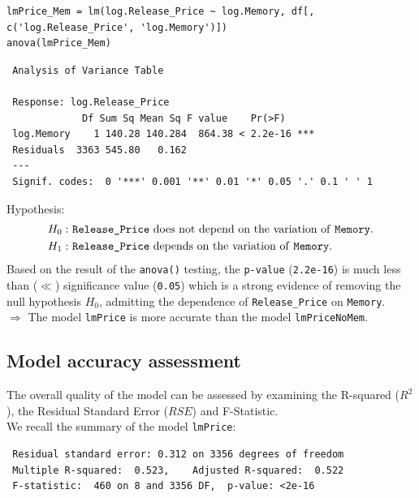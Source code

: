 \documentclass[a4paper]{article}
\begin{document}
\begin{mdframed}[leftline=false,rightline=false,backgroundcolor=lightblue!10,nobreak=false]
    \begin{verbatim}
lmPrice_Mem = lm(log.Release_Price ~ log.Memory, df[, c('log.Release_Price', 'log.Memory')])
anova(lmPrice_Mem)
    \end{verbatim}
\end{mdframed}
\begin{lstlisting}
 Analysis of Variance Table

 Response: log.Release_Price
             Df Sum Sq Mean Sq F value    Pr(>F)    
 log.Memory    1 140.28 140.284  864.38 < 2.2e-16 ***
 Residuals  3363 545.80   0.162                    
 ---
 Signif. codes:  0 '***' 0.001 '**' 0.01 '*' 0.05 '.' 0.1 ' ' 1
\end{lstlisting}
Hypothesis:
\begin{align*}
    H_0: &\text{ \texttt{Release\_Price} does not depend on the variation of \texttt{Memory}}.\\
    H_1: &\text{ \texttt{Release\_Price} depends on the variation of \texttt{Memory}}.
\end{align*}
Based on the result of the \verb|anova()| testing, the \verb|p-value| (\verb|2.2e-16|) is much less than ($\ll$) significance value (\verb|0.05|) which is a strong evidence of removing the null hypothesis $H_0$, admitting the dependence of \verb|Release_Price| on \verb|Memory|.\\
$\Rightarrow$ The model \verb|lmPrice| is more accurate than the model \verb|lmPriceNoMem|.

\subsection{Model accuracy assessment}
The overall quality of the model can be assessed by examining the R-squared ($R^2$), the Residual Standard Error ($RSE$) and F-Statistic.\\
We recall the summary of the model \verb|lmPrice|:
\begin{lstlisting}
 Residual standard error: 0.312 on 3356 degrees of freedom
 Multiple R-squared:  0.523,	Adjusted R-squared:  0.522 
 F-statistic:  460 on 8 and 3356 DF,  p-value: <2e-16
\end{lstlisting}
\end{document}

